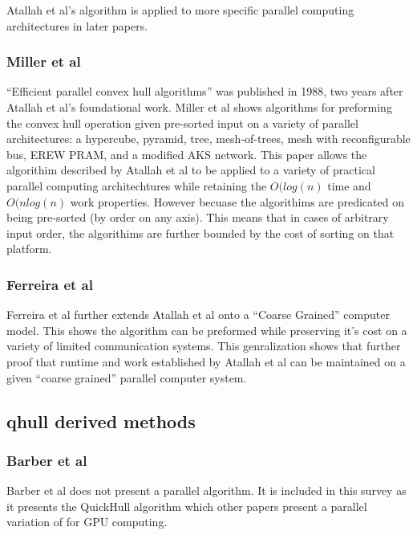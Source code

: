 \documentclass[10pt,a4paper]{report}
\begin{document}

Atallah et al's algorithm is applied to more specific parallel computing architectures in later papers.



\subsubsection{Miller et al}

``Efficient parallel convex hull algorithms''\cite{Russ1988Efficient} was published in 1988, two years after Atallah et al's\cite{Atallah1986Efficient} foundational work.
Miller et al\cite{Russ1988Efficient} shows algorithms for preforming the convex hull operation given pre-sorted input on a variety of parallel architectures: a hypercube, pyramid,
tree, mesh-of-trees, mesh with reconfigurable bus, EREW PRAM, and a modified AKS network.
This paper allows the algorithim described by Atallah et al\cite{Atallah1986Efficient} to be applied to a variety of practical parallel computing architechtures while retaining the $O(log(n)$ time and $O(nlog(n)$ work properties. However becuase the algorithims are predicated on being pre-sorted (by order on any axis). This means that in cases of arbitrary input order, the algorithims are further bounded by the cost of sorting on that platform.


\subsubsection{Ferreira et al}

Ferreira et al\cite{Mohamadou1999Scalable} further extends Atallah et al onto a ``Coarse Grained'' computer model. This shows the algorithm can be preformed while preserving it's cost on a variety of limited communication systems. This genralization shows that further proof that runtime and work established by Atallah et al can be maintained on a given ``coarse grained'' parallel computer system.


\subsection{qhull derived methods}
\subsubsection{Barber et al}
Barber et al\cite{Barber1996} does not present a parallel algorithm. It is included in this survey as it presents the QuickHull algorithm which other papers present a parallel variation of for GPU computing.
\end{document}
